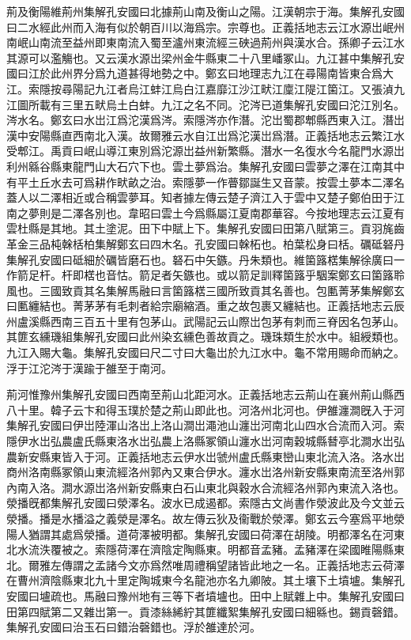 荊及衡陽維荊州集解孔安國曰北據荊山南及衡山之陽。江漢朝宗于海。集解孔安國曰二水經此州而入海有似於朝百川以海爲宗。宗尊也。正義括地志云江水源岀岷州南岷山南流至益州即東南流入蜀至瀘州東流經三硤過荊州與漢水合。孫卿子云江水其源可以濫觴也。又云漢水源岀梁州金牛縣東二十八里嶓冢山。九江甚中集解孔安國曰江於此州界分爲九道甚得地勢之中。鄭玄曰地理志九江在尋陽南皆東合爲大江。索隱按尋陽記九江者烏江蚌江烏白江嘉靡江沙江畎江廩江隄江箘江。又張湞九江圖所載有三里五畎烏土白蚌。九江之名不同。沱涔已道集解孔安國曰沱江別名。涔水名。鄭玄曰水岀江爲沱漢爲涔。索隱涔亦作潛。沱岀蜀郡郫縣西東入江。潛岀漢中安陽縣直西南北入漢。故爾雅云水自江岀爲沱漢岀爲潛。正義括地志云繁江水受郫江。禹貢曰岷山導江東別爲沱源岀益州新繁縣。潛水一名復水今名龍門水源岀利州緜谷縣東龍門山大石穴下也。雲土夢爲治。集解孔安國曰雲夢之澤在江南其中有平土丘水去可爲耕作畎畝之治。索隱夢一作瞢鄒誕生又音蒙。按雲土夢本二澤名蓋人以二澤相近或合稱雲夢耳。知者據左傳云楚子濟江入于雲中又楚子鄭伯田于江南之夢則是二澤各別也。韋昭曰雲土今爲縣屬江夏南郡華容。今按地理志云江夏有雲杜縣是其地。其土塗泥。田下中賦上下。集解孔安國曰田第八賦第三。貢羽旄齒革金三品杶榦栝柏集解鄭玄曰四木名。孔安國曰榦柘也。柏葉松身曰栝。礪砥砮丹集解孔安國曰砥細於礪皆磨石也。砮石中矢鏃。丹朱類也。維箘簬楛集解徐廣曰一作箭足杆。杆即楛也音怙。箭足者矢鏃也。或以箭足訓釋箘簬乎駰案鄭玄曰箘簬聆風也。三國致貢其名集解馬融曰言箘簬楛三國所致貢其名善也。包匭菁茅集解鄭玄曰匭纏結也。菁茅茅有毛刺者給宗廟縮酒。重之故包裹又纏結也。正義括地志云辰州盧溪縣西南三百五十里有包茅山。武陽記云山際岀包茅有刺而三脊因名包茅山。其篚玄纁璣組集解孔安國曰此州染玄纁色善故貢之。璣珠類生於水中。組綬類也。九江入賜大龜。集解孔安國曰尺二寸曰大龜岀於九江水中。龜不常用賜命而納之。浮于江沱涔于漢踰于雒至于南河。

荊河惟豫州集解孔安國曰西南至荊山北距河水。正義括地志云荊山在襄州荊山縣西八十里。韓子云卞和得玉璞於楚之荊山即此也。河洛州北河也。伊雒瀍澗旣入于河集解孔安國曰伊岀陸渾山洛岀上洛山澗岀澠池山瀍岀河南北山四水合流而入河。索隱伊水岀弘農盧氏縣東洛水岀弘農上洛縣冢領山瀍水岀河南穀城縣朁亭北澗水岀弘農新安縣東皆入于河。正義括地志云伊水岀虢州盧氏縣東巒山東北流入洛。洛水岀商州洛南縣冢領山東流經洛州郭內又東合伊水。瀍水岀洛州新安縣東南流至洛州郭內南入洛。澗水源岀洛州新安縣東白石山東北與穀水合流經洛州郭內東流入洛也。滎播旣都集解孔安國曰滎澤名。波水已成遏都。索隱古文尚書作滎波此及今文並云滎播。播是水播溢之義滎是澤名。故左傳云狄及衞戰於滎澤。鄭玄云今塞爲平地滎陽人猶謂其處爲滎播。道荷澤被明都。集解孔安國曰荷澤在胡陵。明都澤名在河東北水流泆覆被之。索隱荷澤在濟陰定陶縣東。明都音孟豬。孟豬澤在梁國睢陽縣東北。爾雅左傳謂之孟諸今文亦爲然唯周禮稱望諸皆此地之一名。正義括地志云荷澤在曹州濟陰縣東北九十里定陶城東今名龍池亦名九卿陂。其土壤下土墳壚。集解孔安國曰壚疏也。馬融曰豫州地有三等下者墳壚也。田中上賦雜上中。集解孔安國曰田第四賦第二又雜岀第一。貢漆絲絺紵其篚纖絮集解孔安國曰細緜也。錫貢磬錯。集解孔安國曰治玉石曰錯治磬錯也。浮於雒達於河。

